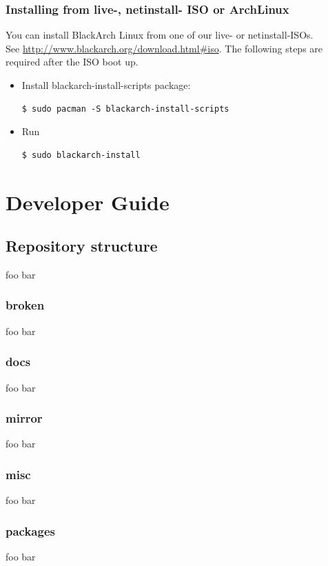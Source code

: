 \documentclass[a4paper, twoside, 11pt]{article}
\begin{document}
\subsubsection{Installing from live-, netinstall- ISO or ArchLinux}
You can install BlackArch Linux from one of our live- or netinstall-ISOs.\\See
\url{http://www.blackarch.org/download.html#iso}. The following steps are
required after the ISO boot up.
\begin{itemize}
\item Install blackarch-install-scripts package:
{\small
\begin{verbatim}
$ sudo pacman -S blackarch-install-scripts
\end{verbatim}
}
\item Run
{\small
\begin{verbatim}
$ sudo blackarch-install
\end{verbatim}
}
\end{itemize}


\section{Developer Guide}

\subsection{Repository structure}
foo bar

\subsubsection{broken}
foo bar

\subsubsection{docs}
foo bar

\subsubsection{mirror}
foo bar

\subsubsection{misc}
foo bar

\subsubsection{packages}
foo bar
\end{document}

